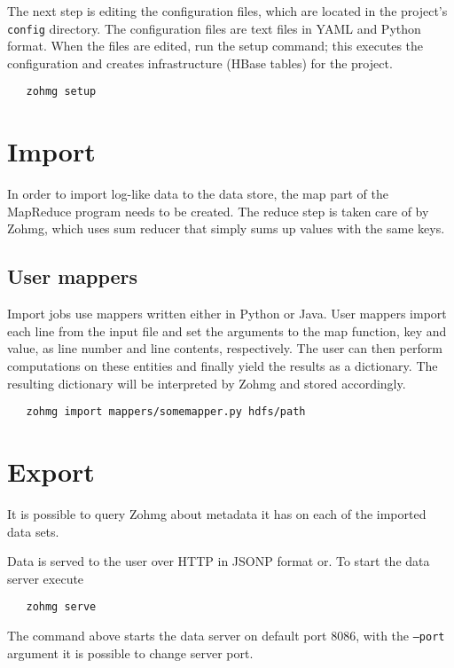 \documentclass[a4paper,10pt]{book}
\begin{document}
\noindent The next step is editing the configuration files, which are located in
the project's \texttt{config} directory. The configuration files are text files
in YAML and Python format. When the files are edited, run the setup command;
this executes the configuration and creates infrastructure (HBase tables) for
the project.

\begin{verbatim}
   zohmg setup
\end{verbatim}


\section{Import}

In order to import log-like data to the data store, the map part of the
MapReduce program needs to be created. The reduce step is taken care of by
Zohmg, which uses sum reducer that simply sums up values with the same keys.


\subsection*{User mappers}

Import jobs use mappers written either in Python or Java. User mappers import
each line from the input file and set the arguments to the map function, key and
value, as line number and line contents, respectively. The user can then perform
computations on these entities and finally yield the results as a dictionary.
The resulting dictionary will be interpreted by Zohmg and stored accordingly.

\begin{verbatim}
   zohmg import mappers/somemapper.py hdfs/path
\end{verbatim}


\section{Export}

It is possible to query Zohmg about metadata it has on each of the imported
data sets.

Data is served to the user over HTTP in JSONP format or. To start the data
server execute

\begin{verbatim}
   zohmg serve
\end{verbatim}

The command above starts the data server on default port 8086, with the
\texttt{--port} argument it is possible to change server port.
\end{document}
